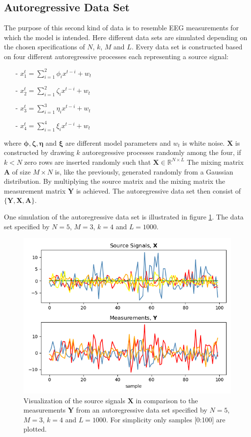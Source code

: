 \subsection{Autoregressive Data Set}
The purpose of this second kind of data is to resemble EEG measurements for which the model is intended. Here different data sets are simulated depending on the chosen specifications of $N$, $k$, $M$ and $L$. 
Every data set is constructed based on four different autoregressive processes each representing a source signal:
\begin{itemize}
\item[-] $x_{1}^{t} = \sum_{i=1}^{2} \phi_i x^{t-i} + w_t$
\item[-] $x_{2}^{t} = \sum_{i=1}^{2} \zeta_i x^{t-i} + w_t$
\item[-] $x_{3}^{t} = \sum_{i=1}^{3} \eta_i x^{t-i} + w_t$
\item[-] $x_{4}^{t} = \sum_{i=1}^{4} \xi_i x^{t-i} + w_t$
\end{itemize}
where $\boldsymbol{\phi}, \boldsymbol{\zeta}, \boldsymbol{\eta}$ and $\boldsymbol{\xi}$ are different model parameters and $w_t$ is white noise.
$\mathbf{X}$ is constructed by drawing $k$ autoregressive processes randomly among the four, if $k < N$ zero rows are inserted randomly such that $\mathbf{X} \in \mathbb{R}^{N \times L}$  
The mixing matrix $\mathbf{A}$ of size $M \times N$ is, like the previously, generated randomly from a Gaussian distribution.
By multiplying the source matrix and the mixing matrix the measurement matrix $\mathbf{Y}$ is achieved.
The autoregressive data set then consist of $\{ \mathbf{Y}, \mathbf{X}, \mathbf{A} \}$. 

One simulation of the autoregressive data set is illustrated in figure \ref{fig:AR}. The data set specified by $N = 5$, $M = 3$, $k = 4$ and $L = 1000$.
\begin{figure}[H]
\centering
\includegraphics[scale=0.5]{figures/ch_6/AR_data.png}
\caption{Visualization of the source signals $\mathbf{X}$ in comparison to the measurements $\mathbf{Y}$ from an autoregressive data set specified by $N = 5$, $M = 3$, $k = 4$ and $L=1000$. For simplicity only samples [0:100] are plotted.}
\label{fig:AR}
\end{figure}
\noindent

